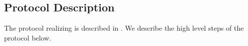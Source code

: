 







\subsection{Protocol Description}
%


The protocol \protocolEM realizing \contentModFunc is described in . We describe the high level steps of the protocol below.




